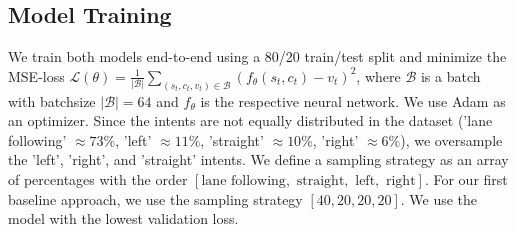 \subsection{Model Training}
\label{subsec:training}

We train both models end-to-end using a 80/20 train/test split and minimize the MSE-loss $\mathcal{L}(\theta) = \frac{1}{\vert \mathcal{B} \vert}\sum_{(s_t, c_t, v_t) \in \mathcal{B}} (f_{\theta}(s_t, c_t) - v_t)^2$, where $\mathcal{B}$ is a batch with batchsize $\vert \mathcal{B}\vert = 64$ and $f_{\theta}$ is the respective neural network. 
We use Adam as an optimizer.
Since the intents are not equally distributed in the dataset ('lane following' $\approx 73 \%$, 'left' $\approx 11 \%$, 'straight' $\approx 10 \%$, 'right' $\approx 6 \%$), we oversample the 'left', 'right', and 'straight' intents. 
We define a sampling strategy as an array of percentages with the order $[\text{lane following}, \text{ straight}, \text{ left}, \text{ right}]$. 
For our first baseline approach, we use the sampling strategy $[40, 20, 20, 20]$.  
We use the model with the lowest validation loss.